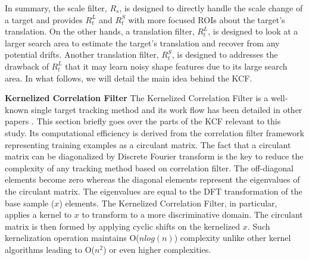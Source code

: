 \documentclass[10pt,twocolumn,letterpaper]{article}
\begin{document}
In summary, the scale filter, $R_{s}$, is designed to directly handle
the scale change of a target and provides $R_{t}^{L}$ and $R_{t}^{S}$
with more focused ROIs about the target's translation. On the other
hands, a translation filter, $R_{t}^{L}$, is designed to look at a
larger search area to estimate the target's translation and recover
from any potential drifts. Another translation filter, $R_{t}^{S}$, is
designed to addresses the drawback of $R_{t}^{L}$ that it may learn
noisy shape features due to its large search area. In what follows, we
will detail the main idea behind the KCF.

\textbf{Kernelized Correlation Filter} The Kernelized Correlation
Filter is a well-known single target tracking method and its work
flow has been detailed in other papers
\cite{henriques2012exploiting,henriques2015high}. This section briefly
goes over the parts of the KCF relevant to this study. Its
computational efficiency is derived from the correlation filter
framework representing training examples as a circulant matrix. The
fact that a circulant matrix can be diagonalized by Discrete Fourier
transform is the key to reduce the complexity of any tracking method
based on correlation filter. The off-diagonal elements become zero
whereas the diagonal elements represent the eigenvalues of the
circulant matrix. The eigenvalues are equal to the DFT transformation
of the base sample ($x$) elements. The Kernelized Correlation Filter,
in particular, applies a kernel to $x$ to transform to a more
discriminative domain. The circulant matrix is then formed by applying
cyclic shifts on the kernelized $x$. Such kernelization operation
maintains O($nlog(n)$) complexity unlike other kernel algorithms
leading to O($n^{2}$) or even higher complexities.
\end{document}
